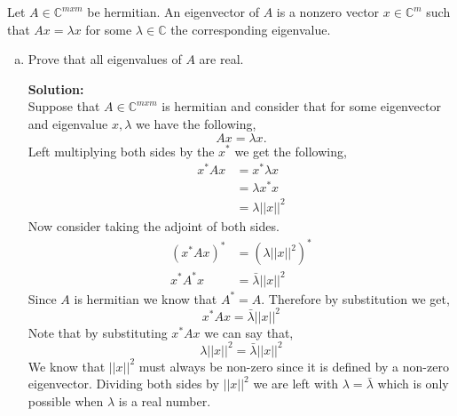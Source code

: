 \documentclass[12pt]{article}
\makeatletter
\theoremstyle{homework}
\newenvironment{exercise}[1]
{\def\@currentlabel{#1}\exercisecore}
{\endexercisecore}
\newcommand{\localhead}[1]{\par\smallskip\noindent\textbf{#1}\nobreak\\}%
\newcommand\solution{\localhead{Solution:}}
\newcommand{\Cplx}{\ensuremath{\mathbb C}}
\let\CC\Cplx
\makeatother
\begin{document}
\newpage
\begin{exercise}{2.3} Let $A \in \CC^{mxm}$ be hermitian. An eigenvector of $A$ is a nonzero vector
  $x \in \CC^m$ such that $Ax = \lambda x$ for some $\lambda \in \CC$ the corresponding eigenvalue. 
  \begin{enumerate}[a.] 
    \item Prove that all eigenvalues of $A$ are real.\\
    \solution Suppose that $A \in \CC^{mxm}$ is hermitian and consider that for some eigenvector and eigenvalue $x, \lambda$ we have the following,
    \begin{equation*}
      Ax = \lambda x.
    \end{equation*}
    Left multiplying both sides by the $x^*$ we get the following,
    \begin{align*}
      x^*Ax &= x^*\lambda x\\
       &= \lambda x^*x\\
       &= \lambda ||x||^2
    \end{align*}
    Now consider taking the adjoint of both sides.
    \begin{align*}
      (x^*Ax)^* &= (\lambda ||x||^2)^*\\
      x^*A^*x &= \bar{\lambda} ||x||^2
    \end{align*}
    Since $A$ is hermitian we know that $A^* = A$. Therefore by substitution we get, 
    \begin{equation*}
      x^*Ax = \bar{\lambda} ||x||^2
    \end{equation*}
    Note that by substituting $x^*Ax$ we can say that, 
    \begin{equation*}
      \lambda ||x||^2 = \bar{\lambda} ||x||^2
    \end{equation*}
    We know that $||x||^2$ must always be non-zero since it is defined by a non-zero eigenvector. 
    Dividing both sides by $||x||^2$ we are left with $\lambda = \bar{\lambda}$ which is only possible when $\lambda$ is a real number.

    \vspace{.15in}


\end{enumerate}
\end{exercise}
\end{document}
